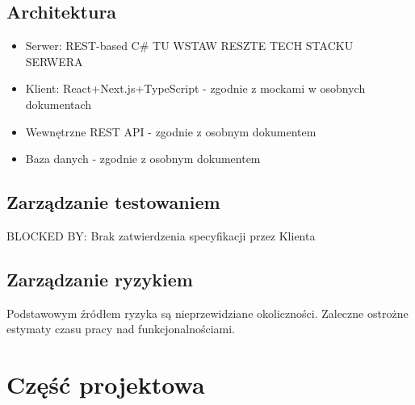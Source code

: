 \documentclass{article}
\begin{document}
\subsection{Architektura}
\begin{itemize}
	\item Serwer: REST-based C\# TU WSTAW RESZTE TECH STACKU SERWERA
	\item Klient: React+Next.js+TypeScript - zgodnie z mockami w osobnych dokumentach
	\item Wewnętrzne REST API - zgodnie z osobnym dokumentem
	\item Baza danych - zgodnie z osobnym dokumentem
\end{itemize}
\subsection{Zarządzanie testowaniem}
BLOCKED BY: Brak zatwierdzenia specyfikacji przez Klienta 
\subsection{Zarządzanie ryzykiem}
Podstawowym źródłem ryzyka są nieprzewidziane okoliczności. Zaleczne ostrożne estymaty czasu pracy nad funkcjonalnościami.
\section{Część projektowa}
\end{document}
